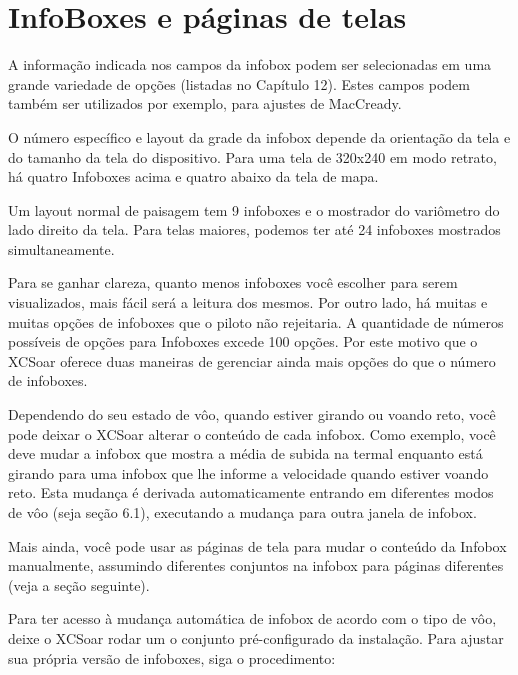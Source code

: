 \section{InfoBoxes e páginas de telas}\label{sec:infoboxandpages}

A informação indicada nos campos da infobox podem ser selecionadas em uma grande variedade de opções (listadas no Capítulo 12).  Estes campos podem também ser utilizados por exemplo, para ajustes de MacCready.

O número específico e layout da grade da infobox depende da orientação da tela e do tamanho da tela do dispositivo.
Para uma tela de 320x240 em modo retrato, há quatro Infoboxes acima e quatro abaixo da tela de mapa.

Um layout normal de paisagem tem 9 infoboxes e o mostrador do variômetro do lado direito da tela.  Para telas maiores, podemos ter até 24 infoboxes mostrados simultaneamente.

Para se ganhar clareza, quanto menos infoboxes você escolher para serem visualizados, mais fácil será a leitura dos mesmos.  Por outro lado, há muitas e muitas opções de infoboxes que o piloto não rejeitaria.  A quantidade de números possíveis de opções para Infoboxes excede 100 opções.  Por este motivo que o XCSoar oferece duas maneiras de gerenciar ainda mais opções do que o número de infoboxes.

Dependendo do seu estado de vôo, quando estiver girando ou voando reto, você pode deixar o XCSoar alterar o conteúdo de cada infobox.  Como exemplo, você deve mudar a infobox que mostra a média de subida na termal enquanto está girando para uma infobox que lhe informe a velocidade quando estiver voando reto.  Esta mudança é derivada automaticamente entrando em diferentes modos de vôo (seja seção 6.1), executando a mudança para outra janela de infobox.

Mais ainda, você pode usar as páginas de tela para mudar o conteúdo da Infobox manualmente, assumindo diferentes conjuntos na infobox para páginas diferentes (veja a seção seguinte).

Para ter acesso à mudança automática de infobox de acordo com o tipo de vôo, deixe o XCSoar rodar um o conjunto pré-configurado da instalação.  Para ajustar sua própria versão de infoboxes, siga o procedimento:


